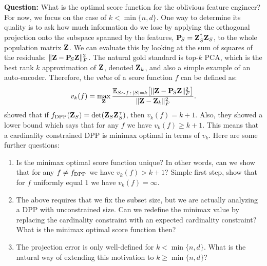 \documentclass[12pt]{sty/colt2019/colt2018-arxiv}
\begin{document}
\textbf{Question:} What is the optimal score function for the
oblivious feature engineer? For now, we focus on the case of $k <
\min\{n,d\}$. One way to determine its quality is to ask how much 
 information do we lose by applying the orthogonal projection onto the
 subspace spanned by the features, $\mathbf P_{\!S}=\mathbf Z_S^\dagger\mathbf Z_S$, to the
 whole population matrix $\mathbf Z$. 
 We can evaluate this by looking at the sum of squares of the
 residuals: $\|\mathbf Z-\mathbf P_{\!S}\mathbf Z\|_F^2$.
The natural gold standard is top-$k$ PCA, which is the
best rank $k$ approximation of $\mathbf Z$, denoted $\mathbf Z_k$, and also a simple
example of an auto-encoder. Therefore, the \emph{value} of a score
function $f$ can be defined as:
\begin{align*}
  v_k(f) =  \max_{\mathbf Z}\frac{\mathbb E_{S\sim
  f\,:\,|S|=k}\big[\|\mathbf Z-\mathbf P_{\!S}\mathbf Z\|_F^2\big]}{\|\mathbf Z-\mathbf Z_k\|_F^2}. 
\end{align*}
\cite{pca-volume-sampling} showed that if
$f_{\DPP}(\Z_S)=\det(\Z_S\Z_S^\top)$, then $v_k(f)=k+1$. Also, they showed a
lower bound which says that for any $f$  we have $v_k(f)\geq
k+1$. This means that a cardinality constrained DPP is minimax optimal
in terms of $v_k$. Here are some further questions:
\begin{enumerate}
  \item Is the minimax optimal score function unique? In other words,
    can we show that for any $f\neq f_{{\mathrm{DPP}}}$ we have $v_k(f)>k+1$?
Simple first step, show that for $f$ uniformly equal $1$ we have
$v_k(f)=\infty$.
 \item The above requires that we fix the subset size, but we are
   actually analyzing a DPP with unconstrained size. Can we redefine
   the minimax value by replacing the cardinality constraint with an
   expected cardinality constraint? What is the minimax optimal score
   function then?
 \item The projection error is only well-defined for
   $k<\min\{n,d\}$. What is the natural way of extending this
   motivation to $k\geq \min\{n,d\}$? 
\end{enumerate}
\end{document}
